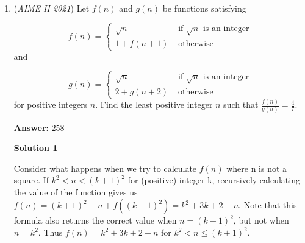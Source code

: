 \begin{enumerate}
 \[\angle AOM = \angle AOB +  \angle BOM = 2 \angle ACB +  \angle CAB.\]

 If  $\angle AOM = 2 \angle ACB +  \angle ABC,$ then  $\angle ABC =  \angle CAB, AC = BC.$

 \textbf{vladimir.shelomovskii@gmail.com, vvsss}

 



\textbf{Solution 5}

Extend $XA$ and meet line $CB$ at $P$. Extend $AG$ to meet $BC$ at $F$. Since $AF$ is the median from $A$ to $BC$, $A,G,F$ are collinear. Furthermore, $OF$ is perpendicular to $BC$

 Draw the circumcircle of $\triangle{XPY}$, as $OA\bot XP, OG\bot XY, OF\bot PY$, $A,G,F$ are collinear, $O$ lies on the circumcircle of $\triangle{XPY}$ as $AGF$ is the Simson line of $\triangle{XPY}$. Thus, $\angle{P}=180-17x, \angle{PAB}=\angle{C}=2x, 180-15x=13x, x=\frac{45}{7}$, the answer is $180-15\cdot \frac{45}{7}=\frac{585}{7}$ which is $\boxed{592}$.

 


	\item (\textit{AIME II 2021}) Let $f(n)$ and $g(n)$ be functions satisfying

 \[f(n) =  \begin{cases} \sqrt{n} & \text{ if } \sqrt{n} \text{ is an integer}\\ 1 + f(n+1) & \text{ otherwise} \end{cases}\]
and

 \[g(n) = \begin{cases}\sqrt{n} & \text{ if } \sqrt{n} \text{ is an integer}\\ 2 + g(n+2) & \text{ otherwise} \end{cases}\]
for positive integers $n$. Find the least positive integer $n$ such that $\frac{f(n)}{g(n)} = \frac{4}{7}$.


 
 \textbf{Answer: }258



\textbf{Solution 1}

Consider what happens when we try to calculate $f(n)$ where n is not a square. If $k^2<n<(k+1)^2$ for (positive) integer k, recursively calculating the value of the function gives us $f(n)=(k+1)^2-n+f((k+1)^2)=k^2+3k+2-n$. Note that this formula also returns the correct value when $n=(k+1)^2$, but not when $n=k^2$. Thus $f(n)=k^2+3k+2-n$ for $k^2<n \leq (k+1)^2$.


\end{enumerate}
